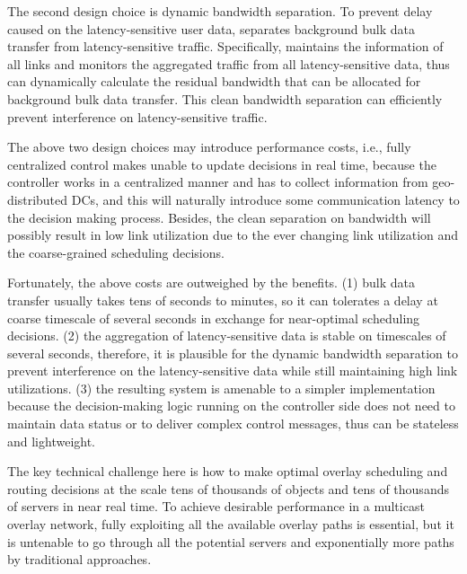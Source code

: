 The second design choice is dynamic bandwidth separation. To prevent delay caused on the latency-sensitive user data, \name separates background bulk data transfer from latency-sensitive traffic. Specifically, \name maintains the information of all links and monitors the aggregated traffic from all latency-sensitive data, thus can dynamically calculate the residual bandwidth that can be allocated for background bulk data transfer. This clean bandwidth separation can efficiently prevent interference on latency-sensitive traffic.

The above two design choices may introduce performance costs, i.e., fully centralized control makes \name unable to update decisions in real time, because the \name controller works in a centralized manner and has to collect information from geo-distributed DCs, and this will naturally introduce some communication latency to the decision making process. Besides, the clean separation on bandwidth will possibly result in low link utilization due to the ever changing link utilization and the coarse-grained scheduling decisions.

Fortunately, the above costs are outweighed by the benefits. (1) bulk data transfer usually takes tens of seconds to minutes, so it can tolerates a delay at coarse timescale of several seconds in exchange for near-optimal scheduling decisions. (2) the aggregation of latency-sensitive data is stable on timescales of several seconds, therefore, it is plausible for the dynamic bandwidth separation to prevent interference on the latency-sensitive data while still maintaining high link utilizations. (3) the resulting system is amenable to a simpler implementation because the decision-making logic running on the controller side does not need to maintain data status or to deliver complex control messages, thus can be stateless and lightweight.

The key technical challenge here is how to make optimal overlay scheduling and routing decisions at the scale tens of thousands of objects and tens of thousands of servers in near real time. To achieve desirable performance in a multicast overlay network, fully exploiting all the available overlay paths is essential, but it is untenable to go through all the potential servers and exponentially more paths by traditional approaches.

